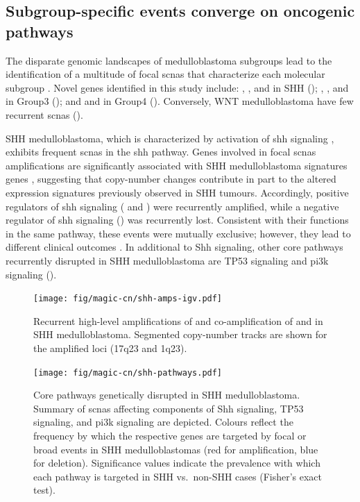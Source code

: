 \subsection{Subgroup-specific events converge on oncogenic pathways}

The disparate genomic landscapes of medulloblastoma subgroups lead to the identification of a multitude of focal \gls{scnas} that characterize each molecular subgroup . Novel genes identified in this study include: , , and  in SHH (); , , and  in Group3 (); and  and  in Group4 (). Conversely, WNT medulloblastoma have few recurrent \gls{scnas} (). 

\clearpage

SHH medulloblastoma, which is characterized by activation of \gls{shh} signaling , exhibits frequent \gls{scnas} in the \gls{shh} pathway. Genes involved in focal \gls{scnas} amplifications are significantly associated with SHH medulloblastoma signatures genes , suggesting that copy-number changes contribute in part to the altered expression signatures previously observed in SHH tumours. Accordingly, positive regulators of \gls{shh} signaling ( and ) were recurrently amplified, while a negative regulator of \gls{shh} signaling () was recurrently lost. Consistent with their functions in the same pathway, these events were mutually exclusive; however, they lead to different clinical outcomes . In additional to Shh signaling, other core pathways recurrently disrupted in SHH medulloblastoma are TP53 signaling and \gls{pi3k} signaling ().

\begin{figure}
	\centering
	\texttt{[image: fig/magic-cn/shh-amps-igv.pdf]}
	\caption[Recurrent amplifications of , , and  in SHH medulloblastoma]
	{
		Recurrent high-level amplifications of  and co-amplification of  and  in SHH medulloblastoma.
		Segmented copy-number tracks are shown for the amplified loci (17q23 and 1q23).
	}
	\label{fig:shh-amps-igv}
\end{figure}

\begin{figure}[5]
	\centering
	\texttt{[image: fig/magic-cn/shh-pathways.pdf]}
	\caption[Core pathways genetically disrupted in SHH medulloblastoma]
	{
	Core pathways genetically disrupted in SHH medulloblastoma.
	Summary of \gls{scnas} affecting components of Shh signaling, TP53 signaling, and \gls{pi3k} signaling are depicted. Colours reflect the frequency by which the respective genes are targeted by focal or broad events in SHH medulloblastomas (red for amplification, blue for deletion). Significance values indicate the prevalence with which each pathway is targeted in SHH vs.\ non-SHH cases (Fisher's exact test).
	}
	\label{fig:shh-pathways}
\end{figure}

